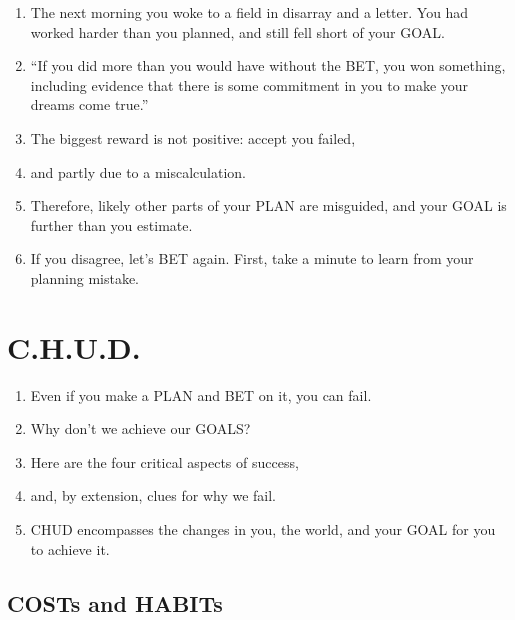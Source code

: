 \documentclass[
]{book}
\providecommand{\tightlist}{%
  \setlength{\itemsep}{0pt}\setlength{\parskip}{0pt}}
\begin{document}
\begin{enumerate}
\def\labelenumi{\arabic{enumi}.}
\setcounter{enumi}{30}
\tightlist
\item
  The next morning you woke to a field in disarray and a letter. You had
  worked harder than you planned, and still fell short of your GOAL.
\item
  ``If you did more than you would have without the BET, you won
  something, including evidence that there is some commitment in you
  to make your dreams come true.''
\item
  The biggest reward is not positive: accept you failed,
\item
  and partly due to a miscalculation.
\item
  Therefore, likely other parts of your PLAN are misguided, and your
  GOAL is further than you estimate.
\item
  If you disagree, let's BET again. First, take a minute to learn from your
  planning mistake.
\end{enumerate}

\hypertarget{c.h.u.d.}{%
\section{C.H.U.D.}\label{c.h.u.d.}}

\begin{enumerate}
\def\labelenumi{\arabic{enumi}.}
\setcounter{enumi}{36}
\tightlist
\item
  Even if you make a PLAN and BET on it, you can fail.
\item
  Why don't we achieve our GOALS?
\item
  Here are the four critical aspects of success,
\item
  and, by extension, clues for why we fail.
\item
  CHUD encompasses the changes in you, the world, and your GOAL for
  you to achieve it.
\end{enumerate}

\hypertarget{costs-and-habits}{%
\subsection{COSTs and HABITs}\label{costs-and-habits}}
\end{document}
